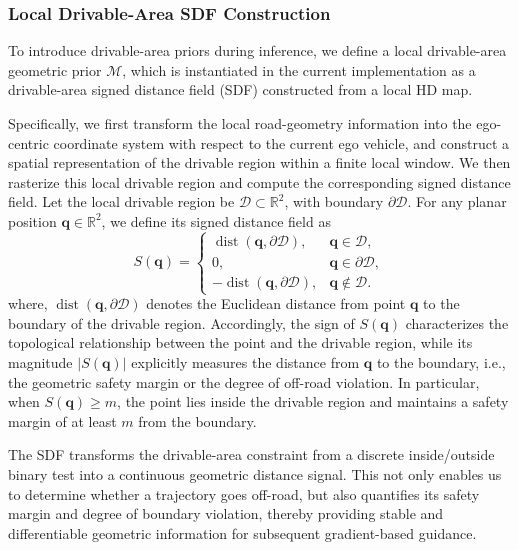 \documentclass[3p,times,authoryear]{elsarticle}
\begin{document}
\subsubsection{Local Drivable-Area SDF Construction}

To introduce drivable-area priors during inference, we define a local drivable-area geometric prior $\mathcal{M}$, which is instantiated in the current implementation as a drivable-area signed distance field (SDF) constructed from a local HD map.

Specifically, we first transform the local road-geometry information into the ego-centric coordinate system with respect to the current ego vehicle, and construct a spatial representation of the drivable region within a finite local window. We then rasterize this local drivable region and compute the corresponding signed distance field. Let the local drivable region be $\mathcal{D} \subset \mathbb{R}^2$, with boundary $\partial \mathcal{D}$. For any planar position $\mathbf{q} \in \mathbb{R}^2$, we define its signed distance field as
\begin{equation}
S(\mathbf{q}) =
\begin{cases}
\operatorname{dist}(\mathbf{q}, \partial \mathcal{D}), & \mathbf{q} \in \mathcal{D},\\
0, & \mathbf{q} \in \partial \mathcal{D},\\
-\operatorname{dist}(\mathbf{q}, \partial \mathcal{D}), & \mathbf{q} \notin \mathcal{D}.
\end{cases}
\end{equation}
where, $\operatorname{dist}(\mathbf{q}, \partial \mathcal{D})$ denotes the Euclidean distance from point $\mathbf{q}$ to the boundary of the drivable region. Accordingly, the sign of $S(\mathbf{q})$ characterizes the topological relationship between the point and the drivable region, while its magnitude $\lvert S(\mathbf{q}) \rvert$ explicitly measures the distance from $\mathbf{q}$ to the boundary, i.e., the geometric safety margin or the degree of off-road violation. In particular, when $S(\mathbf{q}) \ge m$, the point lies inside the drivable region and maintains a safety margin of at least $m$ from the boundary.

The SDF transforms the drivable-area constraint from a discrete inside/outside binary test into a continuous geometric distance signal. This not only enables us to determine whether a trajectory goes off-road, but also quantifies its safety margin and degree of boundary violation, thereby providing stable and differentiable geometric information for subsequent gradient-based guidance.
\end{document}
